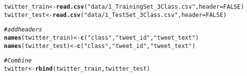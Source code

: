 \documentclass[10pt]{article}\usepackage[]{graphicx}\usepackage[]{xcolor}
\makeatletter
\newcommand{\hlnum}[1]{\textcolor[rgb]{0.686,0.059,0.569}{#1}}%
\newcommand{\hlsng}[1]{\textcolor[rgb]{0.192,0.494,0.8}{#1}}%
\newcommand{\hlcom}[1]{\textcolor[rgb]{0.678,0.584,0.686}{\textit{#1}}}%
\newcommand{\hldef}[1]{\textcolor[rgb]{0.345,0.345,0.345}{#1}}%
\newcommand{\hlkwb}[1]{\textcolor[rgb]{0.69,0.353,0.396}{#1}}%
\newcommand{\hlkwc}[1]{\textcolor[rgb]{0.333,0.667,0.333}{#1}}%
\newcommand{\hlkwd}[1]{\textcolor[rgb]{0.737,0.353,0.396}{\textbf{#1}}}%
\newenvironment{kframe}{%
 \def\at@end@of@kframe{}%
 \ifinner\ifhmode%
  \def\at@end@of@kframe{\end{minipage}}%
  \begin{minipage}{\columnwidth}%
 \fi\fi%
 \def\FrameCommand##1{\hskip\@totalleftmargin \hskip-\fboxsep
 \colorbox{shadecolor}{##1}\hskip-\fboxsep
     \hskip-\linewidth \hskip-\@totalleftmargin \hskip\columnwidth}%
 \MakeFramed {\advance\hsize-\width
   \@totalleftmargin\z@ \linewidth\hsize
   \@setminipage}}%
 {\par\unskip\endMakeFramed%
 \at@end@of@kframe}
\newenvironment{knitrout}{}{} %
\makeatother
\begin{document}
\begin{knitrout}
\color{fgcolor}\begin{kframe}
\begin{alltt}
\hldef{twitter_train} \hlkwb{<-} \hlkwd{read.csv}\hldef{(}\hlsng{"data/1_TrainingSet_3Class.csv"}\hldef{,} \hlkwc{header}\hldef{=}\hlnum{FALSE}\hldef{)}
\hldef{twitter_test} \hlkwb{<-} \hlkwd{read.csv}\hldef{(}\hlsng{"data/1_TestSet_3Class.csv"}\hldef{,} \hlkwc{header}\hldef{=}\hlnum{FALSE}\hldef{)}

\hlcom{# add headers}
\hlkwd{names}\hldef{(twitter_train)} \hlkwb{<-} \hlkwd{c}\hldef{(}\hlsng{"class"}\hldef{,} \hlsng{"tweet_id"}\hldef{,} \hlsng{"tweet_text"}\hldef{)}
\hlkwd{names}\hldef{(twitter_test)} \hlkwb{<-} \hlkwd{c}\hldef{(}\hlsng{"class"}\hldef{,} \hlsng{"tweet_id"}\hldef{,} \hlsng{"tweet_text"}\hldef{)}

\hlcom{# Combine }
\hldef{twitter} \hlkwb{<-} \hlkwd{rbind}\hldef{(twitter_train, twitter_test)}
\end{alltt}
\end{kframe}
\end{knitrout}
\end{document}
